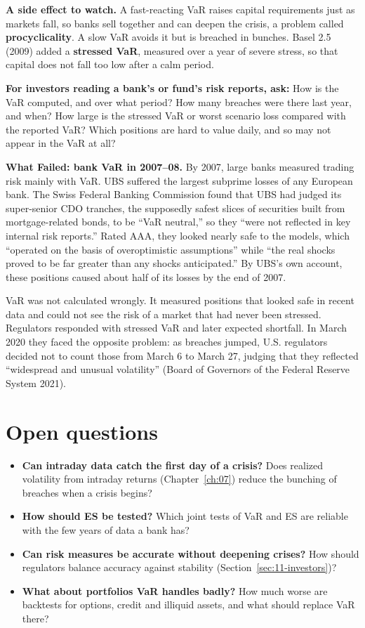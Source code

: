 \textbf{A side effect to watch.} A fast-reacting VaR raises capital requirements just as markets fall, so banks sell together and can deepen the crisis, a problem called \textbf{procyclicality}. A slow VaR avoids it but is breached in bunches. Basel 2.5 (2009) added a \textbf{stressed VaR}, measured over a year of severe stress, so that capital does not fall too low after a calm period.

\textbf{For investors reading a bank's or fund's risk reports, ask:} How is the VaR computed, and over what period? How many breaches were there last year, and when? How large is the stressed VaR or worst scenario loss compared with the reported VaR? Which positions are hard to value daily, and so may not appear in the VaR at all?

\textbf{What Failed: bank VaR in 2007--08.} By 2007, large banks measured trading risk mainly with VaR. UBS suffered the largest subprime losses of any European bank. The Swiss Federal Banking Commission found that UBS had judged its super-senior CDO tranches, the supposedly safest slices of securities built from mortgage-related bonds, to be ``VaR neutral,'' so they ``were not reflected in key internal risk reports.'' Rated AAA, they looked nearly safe to the models, which ``operated on the basis of overoptimistic assumptions'' while ``the real shocks proved to be far greater than any shocks anticipated.'' By UBS's own account, these positions caused about half of its losses by the end of 2007.

VaR was not calculated wrongly. It measured positions that looked safe in recent data and could not see the risk of a market that had never been stressed. Regulators responded with stressed VaR and later expected shortfall. In March 2020 they faced the opposite problem: as breaches jumped, U.S. regulators decided not to count those from March 6 to March 27, judging that they reflected ``widespread and unusual volatility'' (Board of Governors of the Federal Reserve System 2021).

\section{Open questions}
\label{sec:11-open}

\begin{itemize}
  \item \textbf{Can intraday data catch the first day of a crisis?} Does realized volatility from intraday returns (Chapter~\ref{ch:07}) reduce the bunching of breaches when a crisis begins?
  \item \textbf{How should ES be tested?} Which joint tests of VaR and ES are reliable with the few years of data a bank has?
  \item \textbf{Can risk measures be accurate without deepening crises?} How should regulators balance accuracy against stability (Section~\ref{sec:11-investors})?
  \item \textbf{What about portfolios VaR handles badly?} How much worse are backtests for options, credit and illiquid assets, and what should replace VaR there?
\end{itemize}
